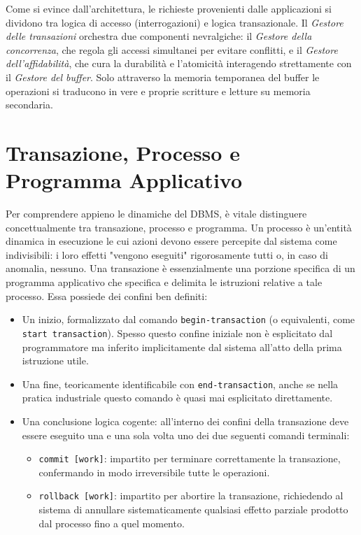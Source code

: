Come si evince dall'architettura, le richieste provenienti dalle applicazioni si dividono tra logica di accesso (interrogazioni) e logica transazionale. Il \textit{Gestore delle transazioni} orchestra due componenti nevralgiche: il \textit{Gestore della concorrenza}, che regola gli accessi simultanei per evitare conflitti, e il \textit{Gestore dell'affidabilità}, che cura la durabilità e l'atomicità interagendo strettamente con il \textit{Gestore del buffer}. Solo attraverso la memoria temporanea del buffer le operazioni si traducono in vere e proprie scritture e letture su memoria secondaria.

\section{Transazione, Processo e Programma Applicativo}

Per comprendere appieno le dinamiche del DBMS, è vitale distinguere concettualmente tra transazione, processo e programma.
Un processo è un'entità dinamica in esecuzione le cui azioni devono essere percepite dal sistema come indivisibili: i loro effetti "vengono eseguiti" rigorosamente tutti o, in caso di anomalia, nessuno.
Una transazione è essenzialmente una porzione specifica di un programma applicativo che specifica e delimita le istruzioni relative a tale processo. Essa possiede dei confini ben definiti:
\begin{itemize}
    \item Un inizio, formalizzato dal comando \texttt{begin-transaction} (o equivalenti, come \texttt{start transaction}). Spesso questo confine iniziale non è esplicitato dal programmatore ma inferito implicitamente dal sistema all'atto della prima istruzione utile.
    \item Una fine, teoricamente identificabile con \texttt{end-transaction}, anche se nella pratica industriale questo comando è quasi mai esplicitato direttamente.
    \item Una conclusione logica cogente: all'interno dei confini della transazione deve essere eseguito una e una sola volta uno dei due seguenti comandi terminali:
    \begin{itemize}
        \item \texttt{commit [work]}: impartito per terminare correttamente la transazione, confermando in modo irreversibile tutte le operazioni.
        \item \texttt{rollback [work]}: impartito per abortire la transazione, richiedendo al sistema di annullare sistematicamente qualsiasi effetto parziale prodotto dal processo fino a quel momento.
    \end{itemize}
\end{itemize}

